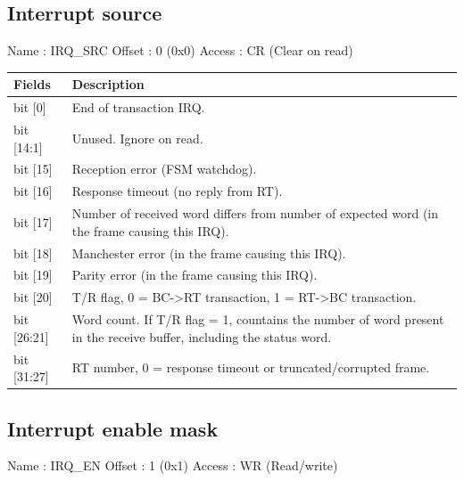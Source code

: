 \documentclass[11pt,a4paper]{article}
\begin{document}
\subsection{Interrupt source}

Name   : IRQ\_SRC \newline
Offset : 0 (0x0) \newline
Access : CR (Clear on read) \newline

\begin{table}[h!]
  \begin{tabularx}{\textwidth}{ l X }
    \hline
    \textbf{Fields} & \textbf{Description}\\
    \hline
    bit [0]     & End of transaction IRQ. \\
    bit [14:1]  & Unused. Ignore on read. \\
    bit [15]    & Reception error (FSM watchdog). \\
    bit [16]    & Response timeout (no reply from RT). \\
    bit [17]    & Number of received word differs from number of expected word (in the frame causing this IRQ). \\
    bit [18]    & Manchester error (in the frame causing this IRQ). \\
    bit [19]    & Parity error (in the frame causing this IRQ). \\
    bit [20]    & T/R flag, 0 = BC->RT transaction, 1 = RT->BC transaction. \\
    bit [26:21] & Word count. If T/R flag = 1, countains the number of word present in the receive buffer, including the status word. \\
    bit [31:27] & RT number, 0 = response timeout or truncated/corrupted frame. \\
    \hline
  \end{tabularx}
\end{table}

\subsection{Interrupt enable mask}

Name   : IRQ\_EN \newline
Offset : 1 (0x1) \newline
Access : WR (Read/write) \newline
\end{document}
